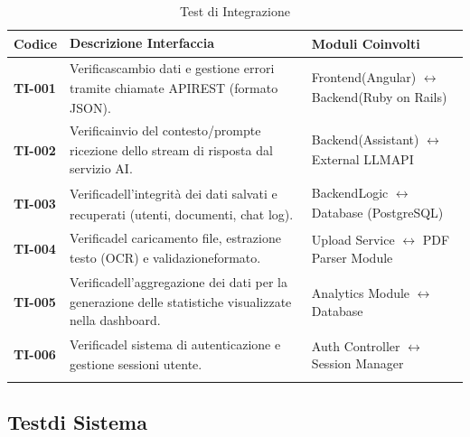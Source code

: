 \documentclass[a4paper,11pt]{article}
\renewcommand{\G}{\texorpdfstring{\textsubscript{\scalebox{0.6}{\textbf{G}}}\xspace}{ G}}
\begin{document}
\begin{longtable}{|p{2.2cm}|p{7cm}|p{3.5cm}|}
  \hline
  \rowcolor{primaryblue!30} 
  \textbf{Codice} & \textbf{Descrizione Interfaccia\G} & \textbf{Moduli Coinvolti} \\
  \hline
  \endhead
  
  \textbf{TI-001} & Verifica\G scambio dati e gestione errori tramite chiamate API\G REST (formato JSON). & Frontend\G (Angular\G) $\leftrightarrow$ Backend\G (Ruby on Rails\G) \\
  \hline
  \textbf{TI-002} & Verifica\G invio del contesto/prompt\G e ricezione dello stream di risposta dal servizio AI\G. & Backend\G (Assistant) $\leftrightarrow$ External LLM\G API\G \\
  \hline
  \textbf{TI-003} & Verifica\G dell'integrità dei dati salvati e recuperati (utenti, documenti, chat log). & Backend\G Logic $\leftrightarrow$ Database (PostgreSQL\G) \\
  \hline
  \textbf{TI-004} & Verifica\G del caricamento file, estrazione testo (OCR\G) e validazione\G formato. & Upload Service $\leftrightarrow$ PDF Parser Module \\
  \hline
  \textbf{TI-005} & Verifica\G dell'aggregazione dei dati per la generazione delle statistiche visualizzate nella dashboard\G. & Analytics Module $\leftrightarrow$ Database \\
  \hline
  \textbf{TI-006} & Verifica\G del sistema di autenticazione e gestione sessioni utente. & Auth Controller $\leftrightarrow$ Session Manager \\
  \hline
  
  \caption{Test di Integrazione}
  \label{tab:test-integrazione}
\end{longtable}


\subsection{Test\G di Sistema}
\end{document}

